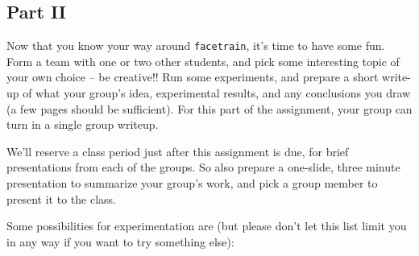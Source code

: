 \subsection{Part II}

Now that you know your way around {\tt facetrain}, it's time to have some fun.
Form a team with one or two other students, and pick some interesting topic of
your own choice -- be creative!!  Run some experiments, and prepare a short
write-up of what your group's idea, experimental results, and any conclusions
you draw (a few pages should be sufficient).  For this part of the assignment,
your group can turn in a single group writeup.

We'll reserve a class period just after this assignment is due, for brief
presentations from each of the groups.  So also prepare a one-slide, three
minute presentation to summarize your group's work, and pick a group member to
present it to the class.

Some possibilities for experimentation are (but please don't let
this list limit you in any way if you want to try something else):

